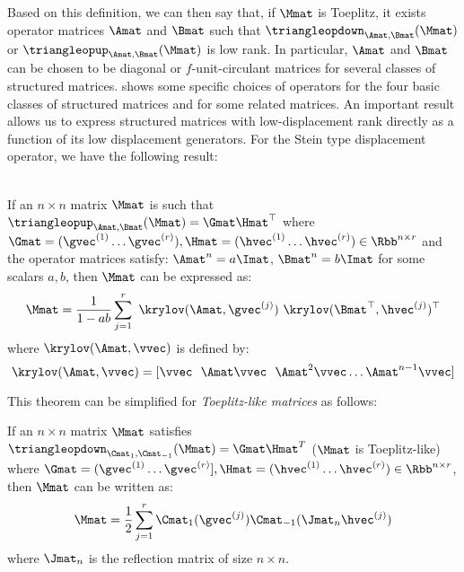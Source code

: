 \noindent
Based on this definition, we can then say that, if $\Mmat$ is Toeplitz, it exists operator matrices $\Amat$ and $\Bmat$ such that $\triangleopdown_{\Amat, \Bmat} (\Mmat)$ or $\triangleopup_{\Amat, \Bmat} (\Mmat)$ is low rank.
In particular, $\Amat$ and $\Bmat$ can be chosen to be diagonal or $f$-unit-circulant matrices for several classes of structured matrices.
 shows some specific choices of operators for the four basic classes of structured matrices and for some related matrices.
An important result allows us to express structured matrices with low-displacement rank directly as a function of its low displacement generators.  
For the Stein type displacement operator, we have the following result:
\begin{theorem} ~\\
  If an $n \times n$ matrix $\Mmat$ is such that $\triangleopup_{\Amat, \Bmat}(\Mmat) = \Gmat \Hmat^\top$ where 
  $\Gmat = (\gvec^{(1)} \ldots \gvec^{(r)}), \Hmat = (\hvec^{(1)} \ldots \hvec^{(r)}) \in \Rbb^{n \times r}$ 
  and the operator matrices satisfy: $\Amat^n = a \Imat$, $\Bmat^n = b \Imat$ for some scalars $a, b$, then $\Mmat$ can be expressed as: 
  \begin{equation}
    \Mmat = \frac{1}{1 - ab} \sum_{j=1}^{r} ~\krylov(\Amat, \gvec^{(j)}) ~\krylov(\Bmat^\top, \hvec^{(j)})^\top
    \label{equation:ch3-krylov_decomposition}
  \end{equation}
  where $\krylov(\Amat, \vvec)$ is defined by:
  \begin{equation}
    \krylov(\Amat, \vvec) = [\vvec~~\Amat\vvec~~\Amat^2 \vvec \ldots \Amat^{n-1} \vvec]
  \end{equation}
  \label{theorem:ch3-krylov_decomposition}
\end{theorem} 
\noindent
This theorem can be simplified for \emph{Toeplitz-like matrices} as follows:
\begin{theorem}
  If an $n \times n$ matrix $\Mmat$ satisfies $\triangleopdown_{\Cmat_1, \Cmat_{-1}}(\Mmat) = \Gmat \Hmat^T$ ($\Mmat$ is Toeplitz-like) where $\Gmat = (\gvec ^{(1)} \ldots \gvec^{(r)}], \Hmat = (\hvec^{(1)} \ldots \hvec^{(r)}) \in \Rbb^{n \times r}$, then $\Mmat$ can be written as: 
  \begin{equation} 
    \Mmat = \frac{1}{2} \sum_{j=1}^{r} \Cmat_1(\gvec^{(j)}) \Cmat_{-1}(\Jmat_n \hvec^{(j)})
    \label{equation:ch3-toeplitz_like_matrix_decomposition}
  \end{equation}
  where $\Jmat_n$ is the reflection matrix of size $n \times n$.
\end{theorem}
